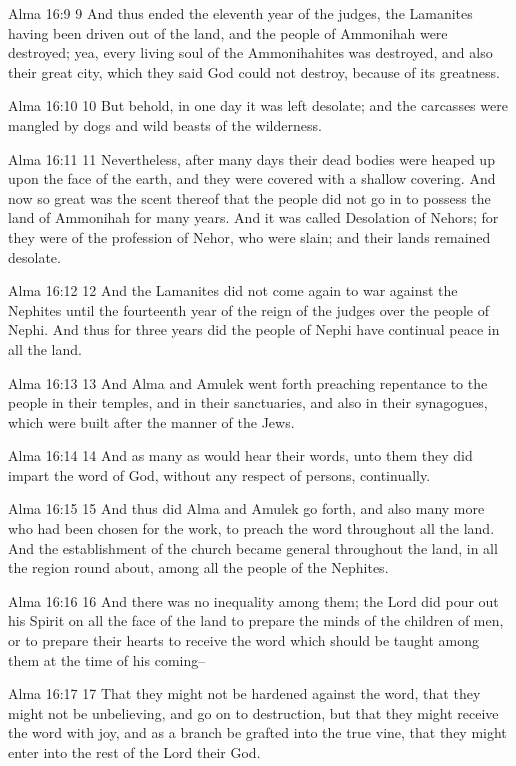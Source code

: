 Alma 16:9
 9 And thus ended the eleventh year of the judges, the Lamanites
having been driven out of the land, and the people of Ammonihah
were destroyed; yea, every living soul of the Ammonihahites was
destroyed, and also their great city, which they said God could
not destroy, because of its greatness.

Alma 16:10
 10 But behold, in one day it was left desolate; and the
carcasses were mangled by dogs and wild beasts of the wilderness.

Alma 16:11
 11 Nevertheless, after many days their dead bodies were heaped
up upon the face of the earth, and they were covered with a
shallow covering. And now so great was the scent thereof that
the people did not go in to possess the land of Ammonihah for
many years. And it was called Desolation of Nehors; for they
were of the profession of Nehor, who were slain; and their lands
remained desolate.

Alma 16:12
 12 And the Lamanites did not come again to war against the
Nephites until the fourteenth year of the reign of the judges
over the people of Nephi. And thus for three years did the
people of Nephi have continual peace in all the land.

Alma 16:13
 13 And Alma and Amulek went forth preaching repentance to the
people in their temples, and in their sanctuaries, and also in
their synagogues, which were built after the manner of the Jews.

Alma 16:14
 14 And as many as would hear their words, unto them they did
impart the word of God, without any respect of persons,
continually.

Alma 16:15
 15 And thus did Alma and Amulek go forth, and also many more who
had been chosen for the work, to preach the word throughout all
the land. And the establishment of the church became general
throughout the land, in all the region round about, among all the
people of the Nephites.

Alma 16:16
 16 And there was no inequality among them; the Lord did pour out
his Spirit on all the face of the land to prepare the minds of
the children of men, or to prepare their hearts to receive the
word which should be taught among them at the time of his
coming--

Alma 16:17
 17 That they might not be hardened against the word, that they
might not be unbelieving, and go on to destruction, but that they
might receive the word with joy, and as a branch be grafted into
the true vine, that they might enter into the rest of the Lord
their God.

